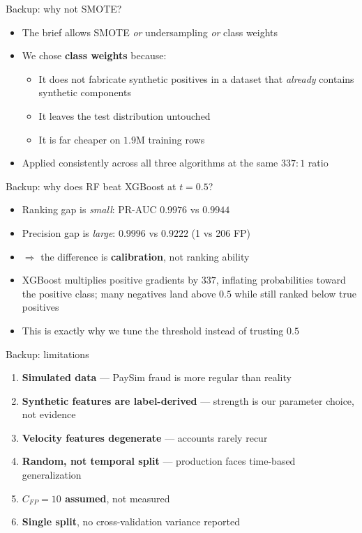 \documentclass[aspectratio=169]{beamer}
\begin{document}
\appendix
\begin{frame}{Backup: why not SMOTE?}
\begin{itemize}
    \item The brief allows SMOTE \emph{or} undersampling \emph{or} class weights
    \item We chose \textbf{class weights} because:
    \begin{itemize}
        \item It does not fabricate synthetic positives in a dataset that
        \emph{already} contains synthetic components
        \item It leaves the test distribution untouched
        \item It is far cheaper on $1.9$M training rows
    \end{itemize}
    \item Applied consistently across all three algorithms at the same
    $337{:}1$ ratio
\end{itemize}
\end{frame}

\begin{frame}{Backup: why does RF beat XGBoost at $t=0.5$?}
\begin{itemize}
    \item Ranking gap is \emph{small}: PR-AUC $0.9976$ vs $0.9944$
    \item Precision gap is \emph{large}: $0.9996$ vs $0.9222$ (1 vs 206 FP)
    \item $\Rightarrow$ the difference is \textbf{calibration}, not ranking ability
    \item XGBoost multiplies positive gradients by $337$, inflating
    probabilities toward the positive class; many negatives land above $0.5$
    while still ranked below true positives
    \item This is exactly why we tune the threshold instead of trusting $0.5$
\end{itemize}
\end{frame}

\begin{frame}{Backup: limitations}
\begin{enumerate}
    \item \textbf{Simulated data} --- PaySim fraud is more regular than reality
    \item \textbf{Synthetic features are label-derived} --- strength is our
    parameter choice, not evidence
    \item \textbf{Velocity features degenerate} --- accounts rarely recur
    \item \textbf{Random, not temporal split} --- production faces time-based
    generalization
    \item \textbf{$C_{FP} = 10$ assumed}, not measured
    \item \textbf{Single split}, no cross-validation variance reported
\end{enumerate}
\end{frame}
\end{document}
